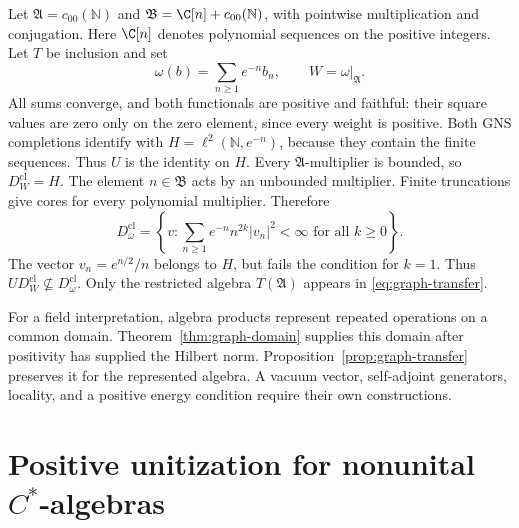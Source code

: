 \begin{example}
Let\label{ex:transfer-domain} $\mathfrak A=c_{00}(\mathbb N)$ and
$\mathfrak B=\C[n]+c_{00}(\mathbb N)$, with pointwise multiplication
and conjugation.  Here $\C[n]$ denotes polynomial sequences on the
positive integers.  Let $T$ be inclusion and set
\[
 \omega(b)=\sum_{n\geq1}e^{-n}b_n,
 \qquad W=\omega|_{\mathfrak A}.
\]
All sums converge, and both functionals are positive and faithful: their
square values are zero only on the zero element, since every weight is positive.
Both GNS completions identify with
$H=\ell^2(\mathbb N,e^{-n})$, because they contain the finite sequences.
Thus $U$ is the identity on $H$.
Every $\mathfrak A$-multiplier is bounded, so $D_W^{\mathrm{cl}}=H$.
The element $n\in\mathfrak B$ acts by an unbounded multiplier.
Finite truncations give cores for every polynomial multiplier.  Therefore
\[
 D_\omega^{\mathrm{cl}}
 =\left\{v:\sum_{n\geq1}e^{-n}n^{2k}|v_n|^2<\infty
               \text{ for all }k\geq0\right\}.
\]
The vector $v_n=e^{n/2}/n$ belongs to $H$, but fails the condition for
$k=1$.  Thus $U D_W^{\mathrm{cl}}\nsubseteq D_\omega^{\mathrm{cl}}$.
Only the restricted algebra $T(\mathfrak A)$ appears in
\eqref{eq:graph-transfer}.
\end{example}

For a field interpretation, algebra products represent repeated operations
on a common domain.  Theorem~\ref{thm:graph-domain} supplies this domain
after positivity has supplied the Hilbert norm.
Proposition~\ref{prop:graph-transfer} preserves it for the represented
algebra.  A vacuum vector, self-adjoint generators, locality, and a positive
energy condition require their own constructions.

\section{Positive unitization for nonunital
\texorpdfstring{$C^*$}{C-star}-algebras}

